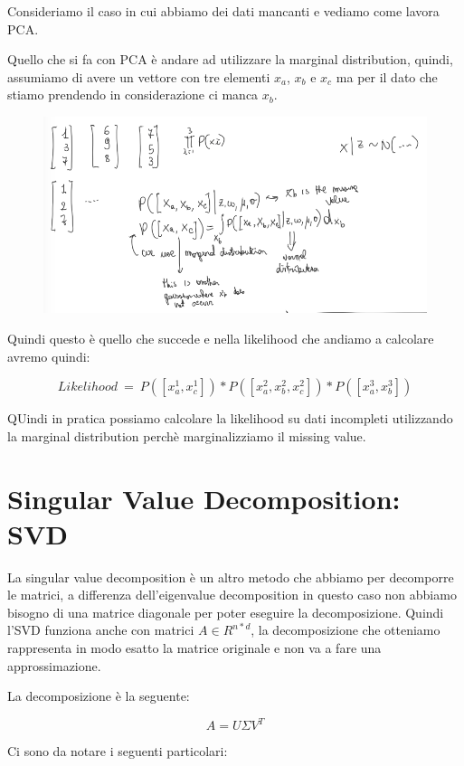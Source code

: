 \documentclass[14pt]{extreport}
\begin{document}
Consideriamo il caso in cui abbiamo dei dati mancanti e vediamo come lavora PCA.

Quello che si fa con PCA è andare ad utilizzare la marginal distribution, quindi, assumiamo di avere un vettore con tre elementi $x_a$, $x_b$ e $x_c$ ma per il 
dato che stiamo prendendo in considerazione ci manca $x_b$. 


\begin{figure}[H] 
\centering
\includegraphics[width=0.7\linewidth]{494.jpeg}
\end{figure}

Quindi questo è quello che succede e nella likelihood che andiamo a calcolare avremo quindi: 

$$Likelihood \ = \ P([x_a^1,x_c^1])*P([x_a^2, x_b^2, x_c^2]) * P([x_a^3,x_b^3])$$

QUindi in pratica possiamo calcolare la likelihood su dati incompleti utilizzando la marginal distribution perchè marginalizziamo il missing value.


\section{Singular Value Decomposition: SVD}

La singular value decomposition è un altro metodo che abbiamo per decomporre le matrici, a differenza dell'eigenvalue decomposition in questo caso non abbiamo bisogno di
una matrice diagonale per poter eseguire la decomposizione.
Quindi l'SVD funziona anche con matrici $A \in R^{n*d}$, la decomposizione che otteniamo rappresenta in modo esatto la matrice originale e non va a fare una approssimazione.

La decomposizione è la seguente:

$$A = U \Sigma V^T$$

Ci sono da notare i seguenti particolari:
\end{document}
